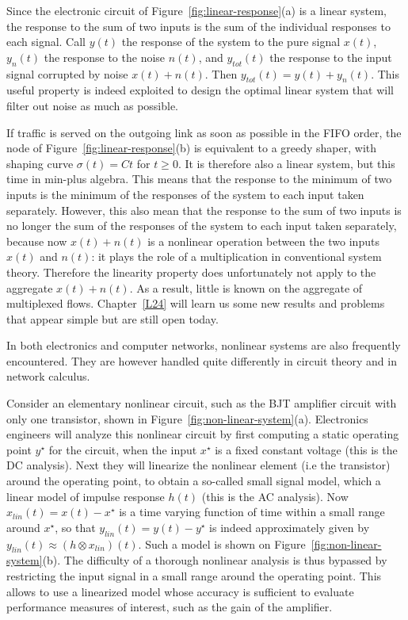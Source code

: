 Since the electronic circuit of
Figure~\ref{fig:linear-response}(a) is a linear system, the
response to the sum of two inputs is the sum of the individual
responses to each signal.  Call $y(t)$ the response of the system
to the pure signal $x(t)$, $y_n(t)$ the response to the noise
$n(t)$, and $y_{tot}(t)$ the response to the input signal
corrupted by noise $x(t) + n(t)$. Then $ y_{tot}(t) = y(t) +
y_n(t)$. This useful property is indeed exploited to design the
optimal linear system that will filter out noise as much as
possible.

If traffic is served on the outgoing link as soon as possible in
the FIFO order, the node of Figure~\ref{fig:linear-response}(b) is
equivalent to a greedy shaper, with shaping curve $\sigma(t) = Ct$
for $t \geq 0$. It is therefore also a linear system, but this
time in min-plus algebra. This means that the response to the
minimum of two inputs is the minimum of the responses of the
system to each input taken separately. However, this also mean
that the response to the sum of two inputs is no longer the sum of
the responses of the system to each input taken separately,
because now  $x(t) + n(t)$ is a nonlinear operation between the
two inputs $x(t)$ and $n(t)$: it plays the role of a
multiplication in conventional system theory. Therefore the
linearity property does unfortunately not apply to the aggregate
$x(t) + n(t)$. As a result, little is known on the aggregate of
multiplexed flows. Chapter~\ref{L24} will learn us some new
results and problems that appear simple but are still open today.

In both electronics and computer networks, nonlinear systems are
also frequently encountered. They are however handled quite
differently in circuit theory and in network calculus.

Consider an elementary nonlinear circuit, such as the BJT
amplifier circuit with only one transistor, shown in
Figure~\ref{fig:non-linear-system}(a). Electronics engineers will
analyze this nonlinear circuit by first computing a static
operating point $y^{\star}$ for the circuit, when the input
$x^{\star}$ is a fixed constant voltage (this is the DC analysis).
Next they will linearize the nonlinear element (i.e the
transistor) around the  operating point, to obtain a so-called
small signal model, which a linear model of impulse response
$h(t)$ (this is the AC analysis). Now $x_{lin}(t) = x(t) -
x^{\star}$ is a time varying function of time within a small range
around $x^{\star}$, so that $y_{lin}(t) = y(t) - y^{\star}$ is
indeed approximately given by $y_{lin}(t) \approx (h  \otimes
x_{lin})(t) $. Such a model is shown on
Figure~\ref{fig:non-linear-system}(b). The difficulty of a
thorough nonlinear analysis is thus bypassed by restricting the
input signal in a small range around the operating point. This
allows to use a linearized model whose accuracy is sufficient to
evaluate performance measures of interest, such as the gain of the
amplifier.

